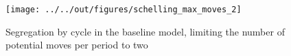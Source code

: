 \documentclass[11pt, a4paper, leqno]{article}
\begin{document}
\begin{figure}
    \caption{Segregation by cycle in the baseline \citet{Schelling69} model, limiting the number of potential moves per period to two}
    
    \texttt{[image: ../../out/figures/schelling\_max\_moves\_2]}

\end{figure}





\printbibliography
{}

\end{document}
